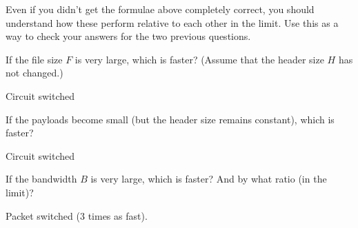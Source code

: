 \documentclass{supervision}
\begin{document}
\begin{questions}
\begin{parts}
\begin{description}
      Even if you didn’t get the formulae above completely correct, you should understand how these perform relative to each other in the limit. Use this as a way to check your answers for the two previous questions.
      \begin{subparts}
        \subpart
        If the file size $F$ is very large, which is faster? (Assume that
the header size $H$ has not changed.)
        \begin{solution}
        Circuit switched
        \end{solution}

        \subpart
        If the payloads become small (but the header size remains constant), which is faster?
        \begin{solution}
        Circuit switched
        \end{solution}

        \subpart
        If the bandwidth $B$ is very large, which is faster? And by
what ratio (in the limit)?
        \begin{solution}
        Packet switched (3 times as fast).
        \end{solution}

      \end{subparts}
    \end{description}

  \end{parts}


  
\end{questions}
\end{document}
